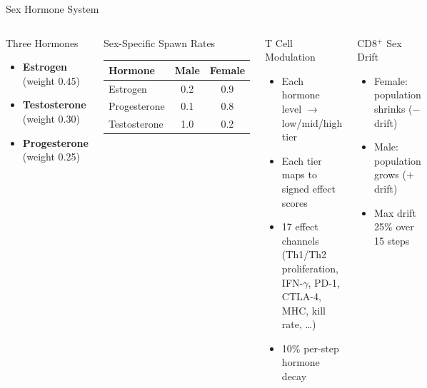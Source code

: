 \documentclass[aspectratio=169,10pt]{beamer}
\begin{document}
\begin{frame}{Sex Hormone System}
  \begin{columns}[T]
    \begin{block}{Three Hormones}
      \begin{itemize}
        \item \textbf{Estrogen} (weight 0.45)
        \item \textbf{Testosterone} (weight 0.30)
        \item \textbf{Progesterone} (weight 0.25)
      \end{itemize}
    \end{block}

    \begin{block}{Sex-Specific Spawn Rates}
      \centering
      \small
      \begin{tabular}{@{}lcc@{}}
        \toprule
        Hormone & Male & Female \\
        \midrule
        Estrogen & 0.2 & 0.9 \\
        Progesterone & 0.1 & 0.8 \\
        Testosterone & 1.0 & 0.2 \\
        \bottomrule
      \end{tabular}
    \end{block}

    \begin{block}{T Cell Modulation}
      \begin{itemize}
        \item Each hormone level $\to$ low/mid/high tier
        \item Each tier maps to signed effect scores
        \item 17 effect channels (Th1/Th2 proliferation, IFN-$\gamma$, PD-1, CTLA-4, MHC, kill rate, \ldots)
        \item 10\% per-step hormone decay
      \end{itemize}
    \end{block}

    \begin{block}{CD8$^+$ Sex Drift}
      \begin{itemize}
        \item Female: population shrinks ($-$ drift)
        \item Male: population grows ($+$ drift)
        \item Max drift 25\% over 15 steps
      \end{itemize}
    \end{block}
  \end{columns}
\end{frame}
\end{document}
